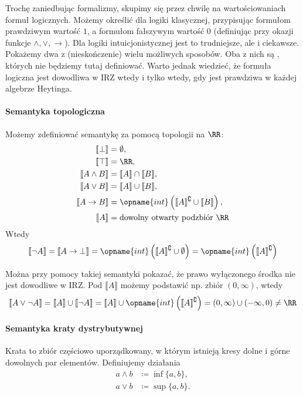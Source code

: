 \documentclass[polish,pretty]{angav}
\begin{document}
Trochę zaniedbując formalizmy, skupimy się przez chwilę na wartościowaniach formuł logicznych.
Możemy określić  dla logiki klasycznej, przypisując formułom prawdziwym wartość $1$, a formułom fałszywym wartość $0$ (definiując przy okazji funkcje $\land, \lor, \to$).
Dla logiki intuicjonistycznej jest to trudniejsze, ale i ciekawsze. Pokażemy dwa z (nieskończenie) wielu możliwych sposobów.
Oba z nich są , których nie będziemy tutaj definiować.
Warto jednak wiedzieć, że formuła logiczna jest dowodliwa w IRZ wtedy i tylko wtedy, gdy jest prawdziwa w każdej algebrze Heytinga.

\paragraph{Semantyka topologiczna}
Możemy zdefiniować semantykę za pomocą topologii na $\RR$:
\begin{align*}
    \llbracket \bot \rrbracket &= \emptyset, \\
    \llbracket \top \rrbracket &= \RR, \\
    \llbracket A \land B \rrbracket &= \llbracket A \rrbracket \cap \llbracket B \rrbracket, \\
    \llbracket A \lor B \rrbracket &= \llbracket A \rrbracket \cup \llbracket B \rrbracket, \\
    \llbracket A \to B \rrbracket &= \opname{int}\left(\llbracket A \rrbracket^\complement \cup \llbracket B \rrbracket\right), \\
    \llbracket A \rrbracket &= \text{dowolny otwarty podzbiór $\RR$}
\end{align*}
Wtedy
\[ \llbracket \neg A \rrbracket = \llbracket A \to \bot \rrbracket = \opname{int}\left(\llbracket A \rrbracket^\complement \cup \emptyset\right) = \opname{int}\left(\llbracket A \rrbracket^\complement\right) \]

Można przy pomocy takiej semantyki pokazać, że prawo wyłączonego środka nie jest dowodliwe w IRZ. Pod $\llbracket A \rrbracket$ możemy podstawić np. zbiór $(0, \infty)$, wtedy
\[ \llbracket A \lor \neg A \rrbracket = \llbracket A \rrbracket \cup \llbracket \neg A \rrbracket = \llbracket A \rrbracket \cup \opname{int}\left(\llbracket A \rrbracket^\complement\right) = (0, \infty) \cup (-\infty, 0) \neq \RR \]

\paragraph{Semantyka kraty dystrybutywnej}
Krata to zbiór częściowo uporządkowany, w którym istnieją kresy dolne i górne dowolnych par elementów. Definiujemy działania
\begin{align*}
    a \land b &\coloneqq \inf\{a, b\}, \\
    a \lor b &\coloneqq \sup\{a, b\}.
\end{align*}
\end{document}
